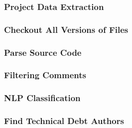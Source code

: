 \subsubsection*{Project Data Extraction}
\label{subsub:project_data_extraction}

\subsubsection*{Checkout All Versions of Files}
\label{subsub:checkout_all_versions_of_files}

\subsubsection*{Parse Source Code}
\label{subsub:parse_source_code}

\subsubsection*{Filtering Comments}
\label{subsub:filtering_comments}

\subsubsection*{NLP Classification}
\label{subsub:nlp_classification}

\subsubsection*{Find Technical Debt Authors}
\label{subsub:find_technical_debt_authors}


